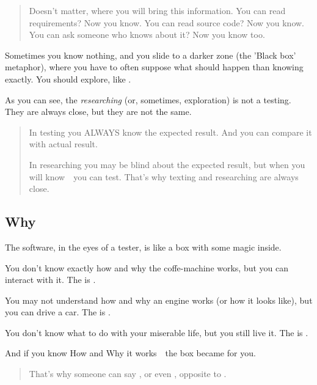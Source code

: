 \begin{quote}
Doesn't matter, where you will bring this information. You can read requirements? Now you know. You can read source code? Now you know. You can ask someone who knows about it? Now you know too. 
\end{quote} 

Sometimes you know nothing, and you slide to a darker zone (the 'Black box' metaphor), where you have to often suppose what should happen than knowing exactly. You should explore, like .

As you can see, the \emph{researching} (or, sometimes, exploration) is not a testing. They are always close, but they are not the same.

\begin{quote}
In testing you ALWAYS know the expected result. And you can compare it with actual result.

In researching you may be blind about the expected result, but when you will know~\textemdash~you can test. That's why texting and researching are always close.
\end{quote} 

\subsection{Why }

The software, in the eyes of a tester, is like a box with some magic inside.

You don't know exactly how and why the coffe-machine works, but you can interact with it. The  is .

You may not understand how and why an engine works (or how it looks like), but you can drive a car. The  is .

You don't know what to do with your miserable life, but you still live it. The  is .

And if you know How and Why it works~\textemdash~the box became  for you.

\begin{quote}
That's why someone can say , or even , opposite to .
\end{quote} 

